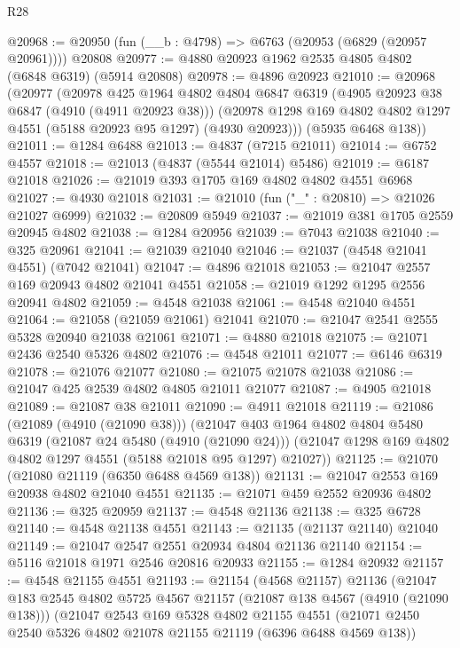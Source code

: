 \begin{lexlean}{R28}
\begin{coremodule}
@20968 := @20950 (fun (__b : @4798) => @6763 (@20953 (@6829 (@20957 @20961)))) @20808
@20977 := @4880 @20923 @1962 @2535 @4805 @4802 (@6848 @6319) (@5914 @20808)
@20978 := @4896 @20923
@21010 := @20968
    (@20977
      (@20978
        @425
        @1964
        @4802
        @4804
        @6847
        @6319
        (@4905 @20923 @38 @6847 (@4910 (@4911 @20923 @38)))
        (@20978 @1298 @169 @4802 @4802 @1297 @4551 (@5188 @20923 @95 @1297) (@4930 @20923)))
      (@5935 @6468 @138))
@21011 := @1284 @6488
@21013 := @4837 (@7215 @21011)
@21014 := @6752 @4557
@21018 := @21013 (@4837 (@5544 @21014) @5486)
@21019 := @6187 @21018
@21026 := @21019 @393 @1705 @169 @4802 @4802 @4551 @6968
@21027 := @4930 @21018
@21031 := @21010 (fun ("_" : @20810) => @21026 @21027 @6999)
@21032 := @20809 @5949
@21037 := @21019 @381 @1705 @2559 @20945 @4802
@21038 := @1284 @20956
@21039 := @7043 @21038
@21040 := @325 @20961
@21041 := @21039 @21040
@21046 := @21037 (@4548 @21041 @4551) (@7042 @21041)
@21047 := @4896 @21018
@21053 := @21047 @2557 @169 @20943 @4802 @21041 @4551
@21058 := @21019 @1292 @1295 @2556 @20941 @4802
@21059 := @4548 @21038
@21061 := @4548 @21040 @4551
@21064 := @21058 (@21059 @21061) @21041
@21070 := @21047 @2541 @2555 @5328 @20940 @21038 @21061
@21071 := @4880 @21018
@21075 := @21071 @2436 @2540 @5326 @4802
@21076 := @4548 @21011
@21077 := @6146 @6319
@21078 := @21076 @21077
@21080 := @21075 @21078 @21038
@21086 := @21047 @425 @2539 @4802 @4805 @21011 @21077
@21087 := @4905 @21018
@21089 := @21087 @38 @21011
@21090 := @4911 @21018
@21119 := @21086
    (@21089 (@4910 (@21090 @38)))
    (@21047
      @403
      @1964
      @4802
      @4804
      @5480
      @6319
      (@21087 @24 @5480 (@4910 (@21090 @24)))
      (@21047 @1298 @169 @4802 @4802 @1297 @4551 (@5188 @21018 @95 @1297) @21027))
@21125 := @21070 (@21080 @21119 (@6350 @6488 @4569 @138))
@21131 := @21047 @2553 @169 @20938 @4802 @21040 @4551
@21135 := @21071 @459 @2552 @20936 @4802
@21136 := @325 @20959
@21137 := @4548 @21136
@21138 := @325 @6728
@21140 := @4548 @21138 @4551
@21143 := @21135 (@21137 @21140) @21040
@21149 := @21047 @2547 @2551 @20934 @4804 @21136 @21140
@21154 := @5116 @21018 @1971 @2546 @20816 @20933
@21155 := @1284 @20932
@21157 := @4548 @21155 @4551
@21193 := @21154
    (@4568 @21157)
    @21136
    (@21047
      @183
      @2545
      @4802
      @5725
      @4567
      @21157
      (@21087 @138 @4567 (@4910 (@21090 @138)))
      (@21047
        @2543
        @169
        @5328
        @4802
        @21155
        @4551
        (@21071 @2450 @2540 @5326 @4802 @21078 @21155 @21119 (@6396 @6488 @4569 @138))

\end{coremodule}
\end{lexlean}
